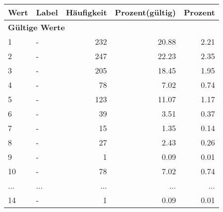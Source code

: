      \begin{longtable}{lXrrr}
     \toprule
     \textbf{Wert} & \textbf{Label} & \textbf{Häufigkeit} & \textbf{Prozent(gültig)} & \textbf{Prozent} \\
     \endhead
     \midrule
     \multicolumn{5}{l}{\textbf{Gültige Werte}}\\
        1 & \multicolumn{1}{X}{-} & %
          \num{232} &
          \num[round-mode=places,round-precision=2]{20.88} &
          \num[round-mode=places,round-precision=2]{2.21} \\
        2 & \multicolumn{1}{X}{-} & %
          \num{247} &
          \num[round-mode=places,round-precision=2]{22.23} &
          \num[round-mode=places,round-precision=2]{2.35} \\
        3 & \multicolumn{1}{X}{-} & %
          \num{205} &
          \num[round-mode=places,round-precision=2]{18.45} &
          \num[round-mode=places,round-precision=2]{1.95} \\
        4 & \multicolumn{1}{X}{-} & %
          \num{78} &
          \num[round-mode=places,round-precision=2]{7.02} &
          \num[round-mode=places,round-precision=2]{0.74} \\
        5 & \multicolumn{1}{X}{-} & %
          \num{123} &
          \num[round-mode=places,round-precision=2]{11.07} &
          \num[round-mode=places,round-precision=2]{1.17} \\
        6 & \multicolumn{1}{X}{-} & %
          \num{39} &
          \num[round-mode=places,round-precision=2]{3.51} &
          \num[round-mode=places,round-precision=2]{0.37} \\
        7 & \multicolumn{1}{X}{-} & %
          \num{15} &
          \num[round-mode=places,round-precision=2]{1.35} &
          \num[round-mode=places,round-precision=2]{0.14} \\
        8 & \multicolumn{1}{X}{-} & %
          \num{27} &
          \num[round-mode=places,round-precision=2]{2.43} &
          \num[round-mode=places,round-precision=2]{0.26} \\
        9 & \multicolumn{1}{X}{-} & %
          \num{1} &
          \num[round-mode=places,round-precision=2]{0.09} &
          \num[round-mode=places,round-precision=2]{0.01} \\
        10 & \multicolumn{1}{X}{-} & %
          \num{78} &
          \num[round-mode=places,round-precision=2]{7.02} &
          \num[round-mode=places,round-precision=2]{0.74} \\
       ... & ... & ... & ... & ... \\
        14 & \multicolumn{1}{X}{-} & %
          \num{1} &
          \num[round-mode=places,round-precision=2]{0.09} &
          \num[round-mode=places,round-precision=2]{0.01} \\


\end{longtable}
